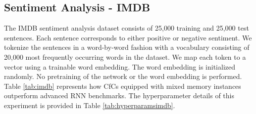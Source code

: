 \documentclass[12pt]{article}
\begin{document}
\subsection*{Sentiment Analysis - IMDB}
The IMDB sentiment analysis dataset \cite{maas2011learning} consists of 25,000 training and 25,000 test sentences. Each sentence corresponds to either positive or negative sentiment. We tokenize the sentences in a word-by-word fashion with a vocabulary consisting of 20,000 most frequently occurring words in the dataset. We map each token to a vector using a trainable word embedding. The word embedding is initialized randomly. No pretraining of the network or the word embedding is performed. Table \ref{tab:imdb} represents how CfCs equipped with mixed memory instances outperform advanced RNN benchmarks. The hyperparameter details of this experiment is provided in Table \ref{tab:hyperparamsimdb}.
\end{document}
